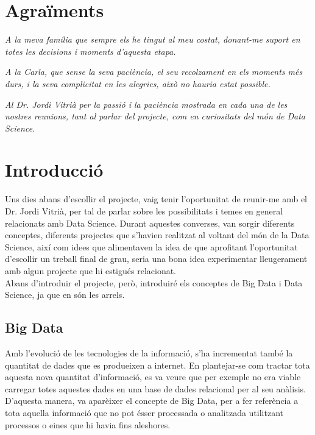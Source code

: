 \documentclass[12pt,a4paper,openright,oneside]{article}
\numberwithin{equation}{section}
\theoremstyle{definition}
\begin{document}
\newpage 


\section*{Agraïments}

\begin{flushright}
\emph{A la meva família que sempre els he tingut al meu costat, donant-me suport en totes les decisions i moments d'aquesta etapa.}
\end{flushright}
\begin{flushright}
\emph{A la Carla, que sense la seva paciència, el seu recolzament en els moments més durs, i la seva complicitat en les alegries, això no hauria estat possible.}
\end{flushright}
\begin{flushright}
\emph{Al Dr. Jordi Vitrià per la passió i la paciència mostrada en cada una de les nostres reunions, tant al parlar del projecte, com en curiositats del món de Data Science.}
\end{flushright}
\newpage

\tableofcontents

\newpage

\setcounter{page}{1}
\section{Introducció}
Uns dies abans d'escollir el projecte, vaig tenir l'oportunitat de reunir-me amb el Dr. Jordi Vitrià, per tal de parlar sobre les possibilitats i temes en general relacionats amb Data Science. Durant aquestes converses, van sorgir diferents conceptes, diferents projectes que s'havien realitzat al voltant del món de la Data Science, així com idees que alimentaven la idea de que aprofitant l'oportunitat d'escollir un treball final de grau, seria una bona idea experimentar lleugerament amb algun projecte que hi estigués relacionat.\\
Abans d'introduir el projecte, però, introduiré els conceptes de Big Data i Data Science, ja que en són les arrels.
\subsection{Big Data}
Amb l'evolució de les tecnologies de la informació, s'ha incrementat també la quantitat de dades que es produeixen a internet. En plantejar-se com tractar tota aquesta nova quantitat d'informació, es va veure que per exemple no era viable carregar totes aquestes dades en una base de dades relacional per al seu anàlisis. D'aquesta manera, va aparèixer el concepte de Big Data, per a fer referència a tota aquella informació que no pot ésser processada o analitzada utilitzant processos o eines que hi havia fins aleshores.\\
\end{document}
